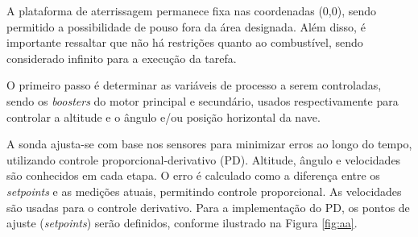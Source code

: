 \documentclass[12pt,           %
a4paper,                       %
openany,                       %
oneside,                       %
chapter=TITLE,                 %
english,                       %
spanish,                       %
brazil,                        %
sumario=tradicional]{abntex2}  %
\begin{document}
\begin{OnehalfSpace}
A plataforma de aterrissagem permanece fixa nas coordenadas (0,0), sendo permitido a possibilidade de pouso fora da área designada. Além disso, é importante ressaltar que não há restrições quanto ao combustível, sendo considerado infinito para a execução da tarefa.

O primeiro passo é determinar as variáveis de processo a serem controladas, sendo os \textit{boosters} do motor principal e secundário, usados respectivamente para controlar a altitude e o ângulo e/ou posição horizontal da nave.


A sonda ajusta-se com base nos sensores para minimizar erros ao longo do tempo, utilizando controle proporcional-derivativo (PD). Altitude, ângulo e velocidades são conhecidos em cada etapa. O erro é calculado como a diferença entre os \textit{setpoints} e as medições atuais, permitindo controle proporcional. As velocidades são usadas para o controle derivativo. Para a implementação do PD, os pontos de ajuste (\textit{setpoints}) serão definidos, conforme ilustrado na Figura \ref{fig:aa}.


\end{OnehalfSpace}
\end{document}
